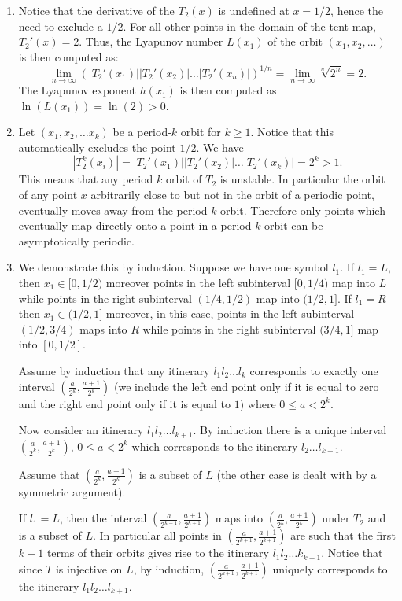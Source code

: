 \documentclass[
  a4paper,
  oneside,
  final]{krantz}
\theoremstyle{definition}
\theoremstyle{definition}
\theoremstyle{definition}
\theoremstyle{definition}
\theoremstyle{remark}
\begin{document}
\begin{enumerate}
\def\labelenumi{\alph{enumi}.}
\setcounter{enumi}{1}
\item
  Notice that the derivative of the \(T_{2}(x)\) is undefined at \(x=1/2\), hence the need to exclude a \(1/2\). For all other points in the domain of the tent map, \(T_{2}'(x) = 2\). Thus, the Lyapunov number \(L(x_1)\) of the orbit \((x_1, x_2, \ldots)\) is then computed as:
  \[
   \lim_{n\to \infty} (|T_{2}'(x_1)||T_{2}'(x_2)| \ldots |T_{2}'(x_n)|)^{1/n} = \lim_{n\to \infty} \sqrt[n]{2^{n}} = 2.
  \]
  The Lyapunov exponent \(h(x_1)\) is then computed as \(\ln(L(x_1)) = \ln(2) >0\).
\item
  Let \((x_1, x_2, \ldots x_{k})\) be a period-\(k\) orbit for \(k \ge 1\). Notice that this automatically excludes the point \(1/2\). We have
  \[|T_{2}^{k}(x_i)| = |T_{2}'(x_1)| |T_{2}'(x_2)| \ldots |T_{2}'(x_k)| = 2^{k} >1.\]
  This means that any period \(k\) orbit of \(T_{2}\) is unstable. In particular the orbit of any point \(x\) arbitrarily close to but not in the orbit of a periodic point, eventually moves away from the period \(k\) orbit. Therefore only points which eventually map directly onto a point in a period-\(k\) orbit can be asymptotically periodic.
\item
  We demonstrate this by induction. Suppose we have one symbol \(l_1\). If \(l_1 = L\), then \(x_1 \in [0, 1/2)\) moreover points in the left subinterval \([0, 1/4)\) map into \(L\) while points in the right subinterval \((1/4,1/2)\) map into \((1/2,1]\). If \(l_1 = R\) then \(x_1 \in (1/2, 1]\) moreover, in this case, points in the left subinterval \((1/2, 3/4)\) maps into \(R\) while points in the right subinterval \((3/4,1]\) map into \([0,1/2]\).

  Assume by induction that any itinerary \(l_1l_2 \ldots l_k\) corresponds to exactly one interval \(\left(\frac{a}{2^{k}}, \frac{a+1}{2^k}\right)\) (we include the left end point only if it is equal to zero and the right end point only if it is equal to \(1\)) where \(0 \le a < 2^{k}\).

  Now consider an itinerary \(l_1l_2 \ldots l_{k+1}\). By induction there is a unique interval \(\left(\frac{a}{2^{k}}, \frac{a+1}{2^{k}}\right)\), \(0 \le a < 2^{k}\) which corresponds to the itinerary \(l_2 \ldots l_{k+1}\).

  Assume that \(\left(\frac{a}{2^{k}}, \frac{a+1}{2^{k}}\right)\) is a subset of \(L\) (the other case is dealt with by a symmetric argument).

  If \(l_1 = L\), then the interval \(\left(\frac{a}{2^{k+1}}, \frac{a+1}{2^{k+1}}\right)\) maps into \(\left(\frac{a}{2^{k}}, \frac{a+1}{2^{k}}\right)\) under \(T_2\) and is a subset of \(L\). In particular all points in \(\left(\frac{a}{2^{k+1}}, \frac{a+1}{2^{k+1}}\right)\) are such that the first \(k+1\) terms of their orbits gives rise to the itinerary \(l_1l_2\ldots k_{k+1}\). Notice that since \(T\) is injective on \(L\), by induction, \(\left(\frac{a}{2^{k+1}}, \frac{a+1}{2^{k+1}}\right)\) uniquely corresponds to the itinerary \(l_1l_2\ldots l_{k+1}\).


\end{enumerate}
\end{document}
